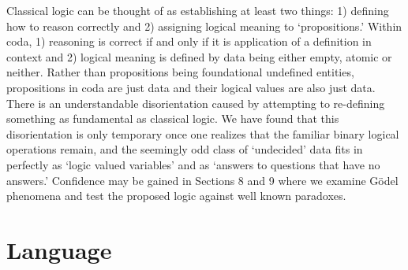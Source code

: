 \documentclass[11pt]{article}
\begin{document}
Classical logic can be thought of as establishing at least two things: 1) defining how to reason correctly and 2) assigning logical meaning to `propositions.' 
Within coda, 1) reasoning is correct if and only if it is application of a definition in context and 2) logical meaning is defined by data being either empty, atomic or neither.  
Rather than propositions being foundational undefined entities, propositions in coda are just data and their logical values are also just data.  
There is an understandable disorientation caused by attempting to re-defining something 
as fundamental as classical logic.  We have found that this disorientation is only temporary once one realizes that the familiar binary logical operations remain,
 and the seemingly odd class of `undecided' data fits in perfectly as `logic valued variables' and as `answers to questions that have no answers.'  Confidence may  
 be gained in Sections 8 and 9 where we examine G\"{o}del phenomena and test the proposed logic against well known paradoxes. 

\section{Language}
\end{document}
